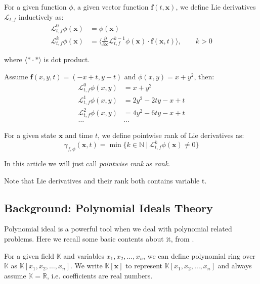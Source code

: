 \documentclass{jssc}
\begin{document}
\begin{definition}
\label{def:lieDeri}
For a given function $\phi$, a given vector function $\boldsymbol{f}(t, \boldsymbol{x})$, we define Lie derivatives $\mathcal{L}_{t, f}$ inductively as:
\begin{align*}
	\mathcal{L}_{t, f}^0 \phi (\boldsymbol{x}) &= \phi (\boldsymbol{x}) \\
	\mathcal{L}_{t, f}^k \phi (\boldsymbol{x}) &= \langle \frac{\partial}{\partial \boldsymbol{x}} \mathcal{L}_{t, f}^{k-1} \phi (\boldsymbol{x}) \cdot  \boldsymbol{f}(\boldsymbol{x}, t) \rangle,\qquad k>0
\end{align*}

where $\langle * \cdot * \rangle$ is dot product.
\end{definition}

\begin{example}
	Assume $\boldsymbol{f}(x,y,t) = (-x+t,y-t)$ and $\phi (x,y) = x + y^2$, then:
	\begin{align*}
		\mathcal{L}_{t, f}^0 \phi (x, y) &= x + y^2 \\
		\mathcal{L}_{t, f}^1 \phi (x, y) &= 2y^2 - 2ty -x + t \\
		\mathcal{L}_{t, f}^2 \phi (x, y) &= 4y^2 - 6ty -x + t \\
		\dots & \dots
	\end{align*}
\end{example}

\begin{definition}
\label{def:lieRank}
For a given state $\boldsymbol{x}$ and time $t$, we define pointwise rank of Lie derivatives as:
\[
	\gamma_{f,\phi}(\boldsymbol{x}, t) = \min\{k \in \mathbb{N}\ |\ \mathcal{L}_{t, f}^k \phi (\boldsymbol{x}) \neq 0\}
\]
\end{definition}

In this article we will just call \emph{pointwise rank} as \emph{rank}.

Note that Lie derivatives and their rank both contains variable t.

\subsection{Background: Polynomial Ideals Theory}
Polynomial ideal is a powerful tool when we deal with polynomial related problems. Here we recall some basic contents about it, from \cite{cox1992ideals}.

For a given field $\mathbb{K}$ and variables $x_1, x_2, \dots, x_n$, we can define polynomial ring over $\mathbb{K}$ as $\mathbb{K}[x_1, x_2, \dots, x_n]$. We write $\mathbb{K}[\boldsymbol{x}]$ to represent $\mathbb{K}[x_1, x_2, \dots, x_n]$ and always assume $\mathbb{K} = \mathbb{R}$, i.e. coefficients are real numbers.
\end{document}

